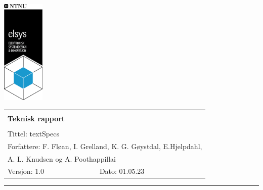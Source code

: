 \begin{minipage}[c]{0.15\textwidth}
\includegraphics[width=2.0cm]{Images/elsys_pos_staaende_ntnu.png}  
\end{minipage}
\begin{minipage}[c]{0.85\textwidth}
\renewcommand{\arraystretch}{1.7}
\large 
\begin{tabularx}{\textwidth}{|X|X|}
\hline
\multicolumn{2}{|l|}{} \\
\multicolumn{2}{|l|}{\huge \textbf{Teknisk rapport}} \\
\multicolumn{2}{|l|}{}  \\
\hline
\multicolumn{2}{|l|}{Tittel: 
textSpecs
} \\
\hline
\multicolumn{2}{|l|}{Forfattere: 
F. Fløan, I. Grelland, K. G. Gøystdal, E.Hjelpdahl, 


} \\
\multicolumn{2}{|l|}{A. L. Knudsen og A. Poothappillai}  \\
\hline

Versjon: 1.0 & Dato: 01.05.23
\\
\hline 
\end{tabularx}
\end{minipage}
\normalsize


\newpage
\setlength{\parskip}{0ex}
\renewcommand{\baselinestretch}{0.1}\normalsize
\tableofcontents
\renewcommand{\baselinestretch}{1.00}\normalsize
\setlength{\parskip}{2ex}
\rule{\textwidth}{1pt}